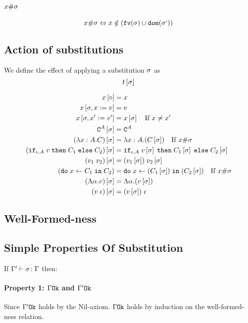 {    \paragraph{$x \# \sigma$}
    \begin{equation}
        x \# \sigma \Leftrightarrow x\notin(\texttt{fv}(\sigma)\cup\texttt{dom}(\sigma`))
    \end{equation}

    \subsection{Action of substitutions}
        We define the effect of applying a substitution $\sigma$ as 
        $$t\left[\sigma\right]$$

        
        \begin{align}
            x\left[\diamond\right] & = x \\
            x\left[\sigma,x:= v\right] & = v \\
            x\left[\sigma,x':= v'\right] & = x\left[\sigma\right]\quad\text{If }x \neq x'\\
            \texttt{C}^{A}\left[\sigma\right] & = \texttt{C}^{A} \\
            (\lambda x : A. C)\left[\sigma\right] &= \lambda x : A. (C\left[\sigma\right])\quad\text{If }x\#\sigma\\
            (\texttt{if}_{\epsilon, A}\; v\; \texttt{then}\; C_1 \;\texttt{else} \; C_2)\left[\sigma\right] &= \texttt{if}_{\epsilon, A}\; v\left[\sigma\right]\; \texttt{then}\; C_1\left[\sigma\right] \;\texttt{else} \; C_2\left[\sigma\right]\\
            (v_1\; v_2)\left[\sigma\right]&= (v_1\left[\sigma\right])\; v_2\left[\sigma\right]\\
            (\texttt{do}\; x \leftarrow C_1 \;\texttt{in}\; C_2)&= \texttt{do}\; x \leftarrow (C_1\left[\sigma\right]) \;\texttt{in}\; (C_2\left[\sigma\right])\quad\text{If } x\#\sigma\\
            (\Lambda \alpha. v)\left[\sigma\right] & = \Lambda \alpha. (v\left[\sigma\right])\\
            (v\;\epsilon)\left[\sigma\right] & = (v\left[\sigma\right])\;\epsilon\\
        \end{align}
    \subsection{Well-Formed-ness}
    
    \subsection{Simple Properties Of Substitution}
    If $\Gamma' \vdash \sigma \colon \Gamma$ then:

        \paragraph{Property 1: $\Gamma \texttt{Ok}$ and $\Gamma' \texttt{Ok}$}
         Since $\Gamma' \texttt{Ok}$ holds by the Nil-axiom. $\Gamma \texttt{Ok}$ holds by induction on the well-formed-ness relation.
}
